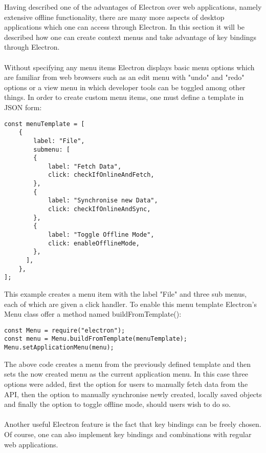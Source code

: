 
Having described one of the advantages of Electron over web applications, namely 
extensive offline functionality, there are many more aspects of desktop applications
which one can access through Electron.
In this section it will be described how one can create context menus and take advantage 
of key bindings through Electron.\paragraph{}
Without specifying any menu items Electron displays basic menu options which are familiar from 
web browsers such as an edit menu with "undo" and "redo" options or a view menu in which developer
tools can be toggled among other things.
In order to create custom menu items, one must define a template in JSON form:
\begin{lstlisting}[caption=Menu template for Electron.]
const menuTemplate = [
    {
        label: "File",
        submenu: [
        {
            label: "Fetch Data",
            click: checkIfOnlineAndFetch,
        },
        {
            label: "Synchronise new Data",
            click: checkIfOnlineAndSync,
        },
        {
            label: "Toggle Offline Mode",
            click: enableOfflineMode,
        },
      ],
    },
];
\end{lstlisting}
This example creates a menu item with the label "File" and three sub menus, each of which are given 
a click handler. 
To enable this menu template Electron's Menu class offer a method named buildFromTemplate():
\begin{lstlisting}[caption=Enabling the custom menu.]
const Menu = require("electron");
const menu = Menu.buildFromTemplate(menuTemplate);
Menu.setApplicationMenu(menu);
\end{lstlisting}
The above code creates a menu from the previously defined template and then sets the now created menu
as the current application menu. 
In this case three options were added, first the option for users to manually fetch data from the API,
then the option to manually synchronise newly created, locally saved objects and finally the option
to toggle offline mode, should users wish to do so.\paragraph{}
Another useful Electron feature is the fact that key bindings can be freely chosen. 
Of course, one can also implement key bindings and combinations with regular web applications.
